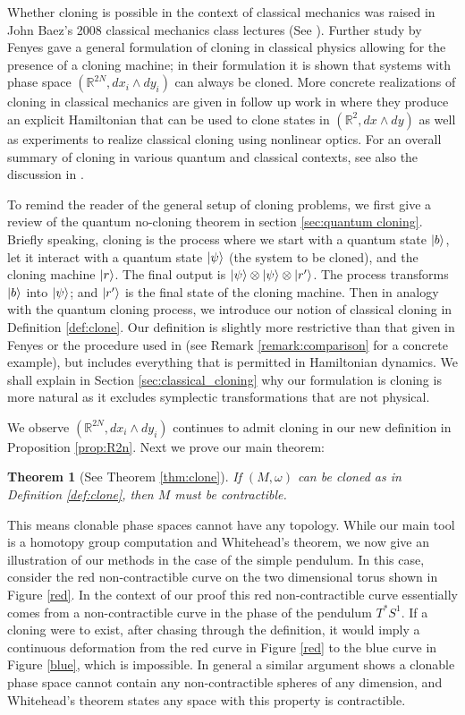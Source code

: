 \documentclass[jmp,amsmath,amssymb]{revtex4-1}
\theoremstyle{plain}
\newtheorem*{theorem*}{Theorem}
\DeclarePairedDelimiter\ket{\lvert}{\rangle}
\begin{document}
Whether cloning is possible in the context of classical mechanics was raised in John Baez's 2008 classical mechanics class lectures (See \cite{fenyes_2010,baez_2008}). Further
study by Fenyes \cite{fenyes} gave a general formulation of cloning in classical physics allowing for the presence of a cloning machine; in their formulation it is shown that systems with phase space $(\mathbb{R}^{2N}, dx_i \wedge dy_i)$ can always be cloned. More concrete realizations of cloning in classical mechanics are given in follow up work in \cite{REDDY2019125846} where they produce an explicit Hamiltonian that can be used to clone states in $(\mathbb{R}^{2},dx\wedge dy)$ as well as experiments to realize classical cloning using nonlinear optics. 
For an overall summary of cloning in various quantum and classical contexts, see also the discussion in \cite{TEH201247}.


To remind the reader of the general setup of cloning problems, we first give a review of the quantum no-cloning theorem in section \ref{sec:quantum cloning}. Briefly speaking, cloning is the process where we start with a quantum state $\ket{b}$, let it interact with a quantum state $\ket{\psi}$ (the system to be cloned), and the cloning machine $\ket{r}$. The final output is $\ket{\psi}\otimes \ket{\psi} \otimes \ket{r'}$. The process transforms $\ket{b}$ into $\ket{\psi}$; and $\ket{r'}$ is the final state of the cloning machine.
Then in analogy with the quantum cloning process, we introduce our notion of classical cloning in Definition \ref{def:clone}. Our definition is slightly more restrictive than that given in Fenyes \cite[Definition 4]{fenyes} or the procedure used in \cite{REDDY2019125846} (see Remark \ref{remark:comparison} for a concrete example), but includes everything that is permitted in Hamiltonian dynamics. We shall explain in Section \ref{sec:classical_cloning} why our formulation is cloning is more natural as it excludes symplectic transformations that are not physical.

We observe $(\mathbb{R}^{2N}, dx_i\wedge dy_i)$ continues to admit cloning in our new definition in Proposition \ref{prop:R2n}. Next we prove our main theorem:
\begin{theorem*}[See Theorem \ref{thm:clone}] If $(M,\omega)$ can be cloned as in Definition \ref{def:clone}, then $M$ must be contractible.
\end{theorem*}
This means clonable phase spaces cannot have any topology. While our main tool is a homotopy group computation and Whitehead's theorem, we now give an illustration of our methods in the case of the simple pendulum. In this case, consider the red non-contractible curve on the two dimensional torus shown in Figure \ref{red}. In the context of our proof this red non-contractible curve essentially comes from a non-contractible curve in the phase of the pendulum $T^*S^1$. If a cloning were to exist, after chasing through the definition, it would imply a continuous deformation from the red curve in Figure \ref{red} to the blue curve in Figure \ref{blue}, which is impossible. In general a similar argument shows a clonable phase space cannot contain any non-contractible spheres of any dimension, and Whitehead's theorem states any space with this property is contractible.
\end{document}
